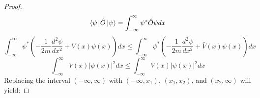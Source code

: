 \begin{sol}
\begin{lemma}
\end{lemma}
\begin{proof}
\begin{equation}
	\bra\psi\hat O\ket\psi=\int_{-\infty}^\infty\psi^*\hat O\psi dx
\end{equation}
\begin{equation}
	\int_{-\infty}^\infty\psi^*\left(-\frac{1}{2m}\frac{d^2\psi}{dx^2}+V(x)\psi(x)\right)dx\leq\int_{-\infty}^\infty\psi^*\left(-\frac{1}{2m}\frac{d^2\psi}{dx^2}+\bar V(x)\psi(x)\right)dx
\end{equation}
\begin{equation}
	\int_{-\infty}^\infty V(x)|\psi(x)|^2dx\leq\int_{-\infty}^\infty\bar V(x)|\psi(x)|^2dx
\end{equation}
Replacing the interval $(-\infty,\infty)$ with $(-\infty,x_1)$, $(x_1,x_2)$, and $(x_2, \infty)$ will yield:


\end{proof}
\end{sol}
